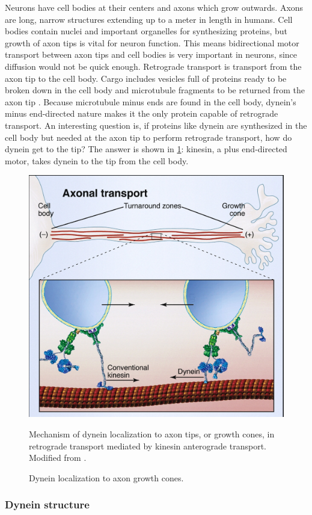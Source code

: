 \documentclass[10pt]{article} %
\begin{document}
Neurons have cell bodies at their centers and axons which grow outwards. Axons are long, narrow structures extending up to a meter in length in humans. Cell bodies contain nuclei and important organelles for synthesizing proteins, but growth of axon tips is vital for neuron function. This means bidirectional motor transport between axon tips and cell bodies is very important in neurons, since diffusion would not be quick enough. Retrograde transport is transport from the axon tip to the cell body. Cargo includes vesicles full of proteins ready to be broken down in the cell body and microtubule fragments to be returned from the axon tip \cite{neuroanatomy}. Because microtubule minus ends are found in the cell body, dynein's minus end-directed nature makes it the only protein capable of retrograde transport. An interesting question is, if proteins like dynein are synthesized in the cell body but needed at the axon tip to perform retrograde transport, how do dynein get to the tip? The answer is shown in \ref{retrograde-transport}: kinesin, a plus end-directed motor, takes dynein to the tip from the cell body.\\

\begin{figure}[h]
  \centering
  \includegraphics[width=.65\textwidth,keepaspectratio]{../../figures/retrograde_transport.jpg}
  \caption{Dynein localization to axon growth cones.}{Mechanism of dynein localization to axon tips, or growth cones, in retrograde transport mediated by kinesin anterograde transport. Modified from \cite{valetoolbox}.}
  \label{retrograde-transport}
\end{figure}

\subsubsection{Dynein structure}
\end{document}

